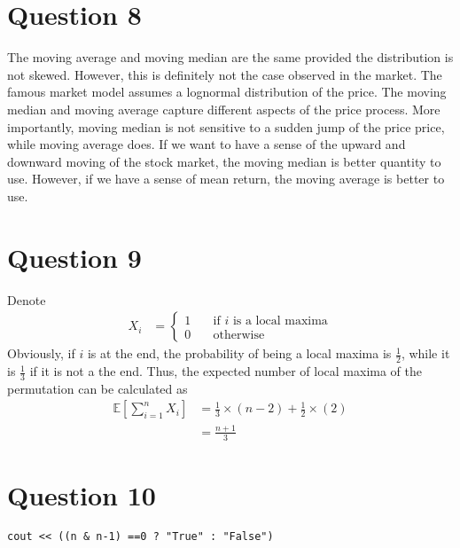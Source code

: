\documentclass[12pt]{article}
\begin{document}
\section*{Question 8}
\begin{solution}
The moving average and moving median are the same provided the distribution is not skewed. However, this is definitely not the case observed in the market. The famous market model assumes a lognormal distribution of the price. The moving median and moving average capture different aspects of the price process. More importantly, moving median is not sensitive to a sudden jump of the price price, while moving average does. If we want to have a sense of the upward and downward moving of the stock market, the moving median is better quantity to use. However, if we have a sense of mean return, the moving average is better to use. 
\end{solution}

\section*{Question 9}
\begin{solution}
Denote 
\begin{align}
X_i  &=
\begin{cases}
1    &\quad\textrm{if } i \textrm{ is a local maxima}    \\ 
 0   &\quad\textrm{otherwise}
\end{cases}
\end{align}
 Obviously, if $i$ is at the end, the probability of being a local maxima is $\frac{1}{2}$, while it is $\frac{1}{3}$ if it is not a the end. Thus, the expected number of local maxima of the permutation can be calculated as  
 \begin{align}
\mathbb{E}\left[\sum_{i=1}^nX_i\right] &= \frac{1}{3}\times (n-2) + \frac{1}{2}\times (2)\nonumber \\
&= \frac{n+1}{3}
\end{align}
\end{solution}

\section*{Question 10}
\begin{solution}
\texttt{cout << ((n \& n-1) ==0 ? "True" : "False")}
\end{solution}
\end{document}
